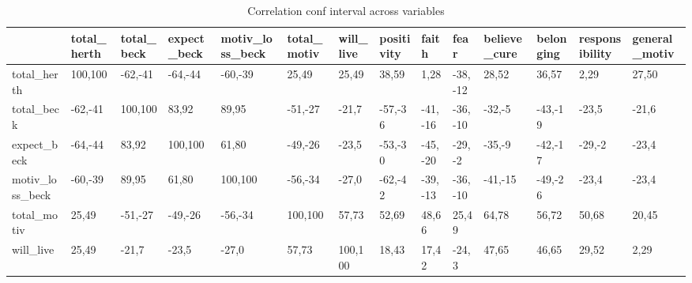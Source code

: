 \begin{table}[H] 
\tiny 
 \caption{Correlation conf interval across variables} 
 \label{correlation_conf_interval_across_variables} 
 \centering 
 \begin{adjustbox}{angle=90}  
 \begin{tabular} {|l|l|l|l|l|l|l|l|l|l|l|l|l|l|}  
 \hline 
  &  total\_herth & total\_beck & expect\_beck & motiv\_loss\_beck & total\_motiv & will\_live & positivity & faith & fear & believe\_cure & belonging & responsibility & general\_motiv \\ 
 \hline 
 total\_herth & {\color{green}100,100} & {\color{red}-62,-41} & {\color{red}-64,-44} & {\color{red}-60,-39} & {\color{green}25,49} & {\color{green}25,49} & {\color{green}38,59} & {\color{green}1,28} & {\color{red}-38,-12} & {\color{green}28,52} & {\color{green}36,57} & {\color{green}2,29} & {\color{green}27,50} \\ 
 \hline 
 total\_beck & {\color{red}-62,-41} & {\color{green}100,100} & {\color{green}83,92} & {\color{green}89,95} & {\color{red}-51,-27} & -21,7 & {\color{red}-57,-36} & {\color{red}-41,-16} & {\color{red}-36,-10} & {\color{red}-32,-5} & {\color{red}-43,-19} & -23,5 & -21,6 \\ 
 \hline 
 expect\_beck & {\color{red}-64,-44} & {\color{green}83,92} & {\color{green}100,100} & {\color{green}61,80} & {\color{red}-49,-26} & -23,5 & {\color{red}-53,-30} & {\color{red}-45,-20} & {\color{red}-29,-2} & {\color{red}-35,-9} & {\color{red}-42,-17} & {\color{red}-29,-2} & -23,4 \\ 
 \hline 
 motiv\_loss\_beck & {\color{red}-60,-39} & {\color{green}89,95} & {\color{green}61,80} & {\color{green}100,100} & {\color{red}-56,-34} & -27,0 & {\color{red}-62,-42} & {\color{red}-39,-13} & {\color{red}-36,-10} & {\color{red}-41,-15} & {\color{red}-49,-26} & -23,4 & -23,4 \\ 
 \hline 
 total\_motiv & {\color{green}25,49} & {\color{red}-51,-27} & {\color{red}-49,-26} & {\color{red}-56,-34} & {\color{green}100,100} & {\color{green}57,73} & {\color{green}52,69} & {\color{green}48,66} & {\color{green}25,49} & {\color{green}64,78} & {\color{green}56,72} & {\color{green}50,68} & {\color{green}20,45} \\ 
 \hline 
 will\_live & {\color{green}25,49} & -21,7 & -23,5 & -27,0 & {\color{green}57,73} & {\color{green}100,100} & {\color{green}18,43} & {\color{green}17,42} & -24,3 & {\color{green}47,65} & {\color{green}46,65} & {\color{green}29,52} & {\color{green}2,29} \\ 

\end{tabular}
\end{adjustbox}
\end{table}
